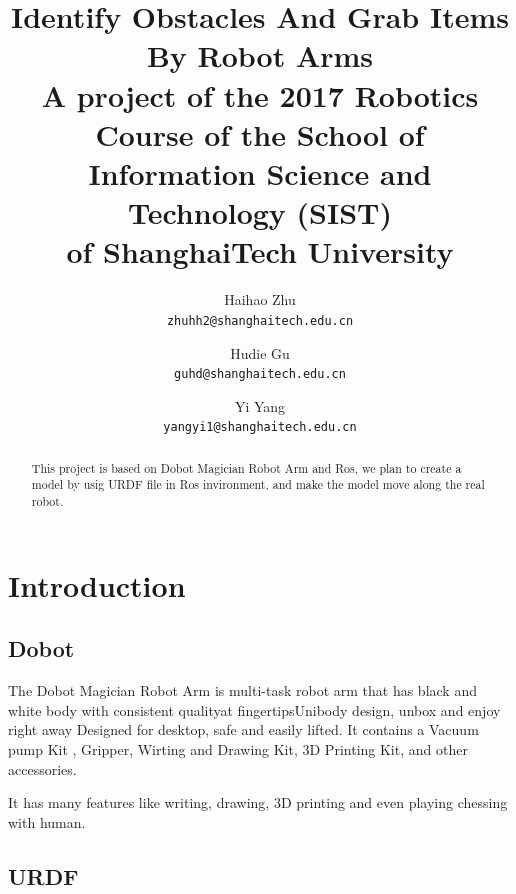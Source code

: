 \documentclass[10pt,twocolumn,letterpaper]{article}
\begin{document}
\title{
Identify Obstacles And Grab Items By Robot Arms \\
\bigskip
\large A project of the	2017 Robotics Course of	the	School of \\
Information Science and Technology (SIST) \\
of ShanghaiTech University}


\author{Haihao Zhu\\
{\tt\small zhuhh2@shanghaitech.edu.cn}
\and
Hudie Gu\\
{\tt\small guhd@shanghaitech.edu.cn}
\and
Yi Yang\\
{\tt\small yangyi1@shanghaitech.edu.cn}
}
\maketitle

\begin{abstract}
   This project is based on Dobot Magician Robot Arm and Ros, we plan to create a model by usig URDF file in Ros invironment, and make the model move along the real robot.
   
\end{abstract}

\section{Introduction}

\subsection{Dobot}
The Dobot Magician Robot Arm is multi-task robot arm that has black and white body with consistent qualityat fingertipsUnibody design, unbox and enjoy right away Designed for desktop, safe and easily lifted. It contains a Vacuum pump Kit , Gripper, Wirting and Drawing Kit, 3D Printing Kit, and other accessories.

It has many features like writing, drawing, 3D printing and even playing chessing with human.  


\subsection{URDF}
\end{document}
